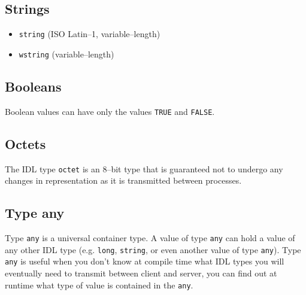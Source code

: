 \subsection{Strings}
\begin{itemize}
  \item {\tt string} (ISO Latin--1, variable--length)
  \item {\tt wstring} (variable--length)
\end{itemize}

\subsection{Booleans}
Boolean values can have only the values {\tt TRUE} and {\tt FALSE}. 

\subsection{Octets}
The IDL type {\tt octet} is an 8--bit type that is guaranteed not to undergo any
changes in representation as it is transmitted between processes.

\subsection{Type any}
Type {\tt any} is a universal container type. A value of type {\tt any} can hold
a value of any other IDL type (e.g. {\tt long}, {\tt string}, or even another
value of type {\tt any}).
Type {\tt any} is useful when you don't know at compile time what IDL types you
will eventually need to transmit between client and server, you can find out at
runtime what type of value is contained in the {\tt any}.

\newpage
